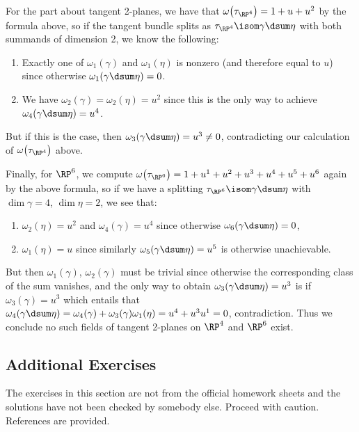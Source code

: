 \begin{solution}
	For the part about tangent 2-planes, we have that $\omega\big(\tau_{\RP^4}\big) = 1 + u + u^2$ by the formula above, so if the tangent bundle splits as $\tau_{\RP^4} \isom \gamma \dsum \eta$ with both summands of dimension 2, we know the following:
	\begin{enumerate}
		\item Exactly one of $\omega_1(\gamma)$ and $\omega_1(\eta)$ is nonzero (and therefore equal to $u$) since otherwise $\omega_1(\gamma \dsum \eta) = 0$.
		\item We have $\omega_2(\gamma) = \omega_2(\eta) = u^2$ since this is the only way to achieve $\omega_4(\gamma \dsum \eta) = u^4$.
	\end{enumerate}
	But if this is the case, then $\omega_3(\gamma \dsum \eta) = u^3 \neq 0$, contradicting our calculation of $\omega\big(\tau_{\RP^4}\big)$ above.

	Finally, for $\RP^6$, we compute $\omega\big(\tau_{\RP^6}\big) = 1 + u^1 + u^2 + u^3 + u^4 + u^5 + u^6$ again by the above formula, so if we have a splitting $\tau_{\RP^6} \isom \gamma \dsum \eta$ with $\dim \gamma = 4$, $\dim \eta = 2$, we see that:
	\begin{enumerate}
		\item $\omega_2(\eta) = u^2$ and $\omega_4(\gamma) = u^4$ since otherwise $\omega_6(\gamma \dsum \eta) = 0$,
		\item $\omega_1(\eta) = u$ since similarly $\omega_5(\gamma \dsum \eta) = u^5$ is otherwise unachievable.
	\end{enumerate}
	But then $\omega_1(\gamma)$, $\omega_2(\gamma)$ must be trivial since otherwise the corresponding class of the sum vanishes, and the only way to obtain $\omega_3(\gamma \dsum \eta) = u^3$ is if $\omega_3(\gamma) = u^3$ which entails that $\omega_4(\gamma \dsum \eta) = \omega_4(\gamma) + \omega_3(\gamma) \omega_1(\eta) = u^4 + u^3 u^1 = 0$, contradiction.
	Thus we conclude no such fields of tangent 2-planes on $\RP^4$ and $\RP^6$ exist.
\end{solution}

\subsection{Additional Exercises}
The exercises in this section are not from the official homework sheets and the solutions have not been checked by somebody else.
Proceed with caution.
References are provided.

